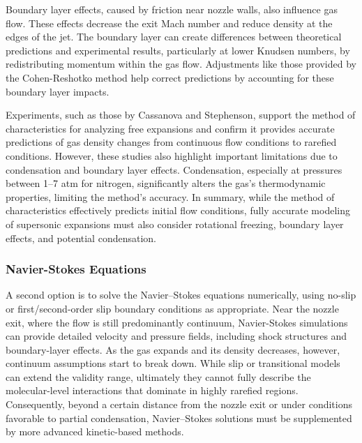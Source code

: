 		Boundary layer effects, caused by friction near nozzle walls, also influence gas flow.
		These effects decrease the exit Mach number and reduce density at the edges of the jet.
		The boundary layer can create differences between theoretical predictions and experimental results, particularly at lower Knudsen numbers, by redistributing momentum within the gas flow.
		Adjustments like those provided by the Cohen-Reshotko method help correct predictions by accounting for these boundary layer impacts.

		Experiments, such as those by Cassanova and Stephenson, support the method of characteristics for analyzing free expansions and confirm it provides accurate predictions of gas density changes from continuous flow conditions to rarefied conditions.
		However, these studies also highlight important limitations due to condensation and boundary layer effects.
		Condensation, especially at pressures between 1–7 atm for nitrogen, significantly alters the gas's thermodynamic properties, limiting the method's accuracy.
		\newpage
		In summary, while the method of characteristics effectively predicts initial flow conditions, fully accurate modeling of supersonic expansions must also consider rotational freezing, boundary layer effects, and potential condensation.
		\cite{jousten_handbook_2016, robertson_investigation_1970, noauthor_zucrow_nodate}

\subsubsection*{Navier-Stokes Equations}
	A second option is to solve the Navier–Stokes equations numerically, using no-slip or first/second-order slip boundary conditions as appropriate.
	Near the nozzle exit, where the flow is still predominantly continuum, Navier-Stokes simulations can provide detailed velocity and pressure fields, including shock structures and boundary-layer effects.
	As the gas expands and its density decreases, however, continuum assumptions start to break down.
	While slip or transitional models can extend the validity range, ultimately they cannot fully describe the molecular-level interactions that dominate in highly rarefied regions.
	Consequently, beyond a certain distance from the nozzle exit or under conditions favorable to partial condensation, Navier–Stokes solutions must be supplemented by more advanced kinetic-based methods.
	\cite{anderson_fundamentals_2017, anderson2021modern}


